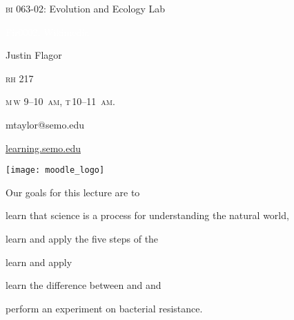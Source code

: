 \documentclass[t]{beamer}
\begin{document}
{
\begin{frame}[b,plain]{\textcolor{orange7}{\textsc{bi} 063-02: Evolution and Ecology Lab}}


\hfill\textcolor{white}{\tiny Fir0002, Wikimedia }
\end{frame}
}

{
\begin{frame}[t,plain]
	\large
	\vspace{5ex}
	\hangpara\hspace{17em} Justin Flagor

	\hangpara\hspace{17em} \textsc{rh} 217

	\hangpara\hspace{17em} \textsc{m}\,\textsc{w} 9--10~\textsc{am}, \textsc{t}\,10--11~\textsc{am}.

	\hangpara\hspace{17em} mtaylor@semo.edu

\end{frame}
}


\begin{frame}[t]{\href{http://learning.semo.edu}{learning.semo.edu}}
	\begin{center}
		\texttt{[image: moodle\_logo]}
		
		\medskip
		
	\end{center}
	
\end{frame}




\begin{frame}[t]{Our goals for this lecture are to}

	\hangpara learn that science is a process for understanding the natural world,
	
	\hangpara learn and apply the five steps of the 
		
	\hangpara learn and apply 
	
	\hangpara learn the difference between  and  and
	
	\hangpara perform an experiment on bacterial resistance.
	
\end{frame}
\end{document}
